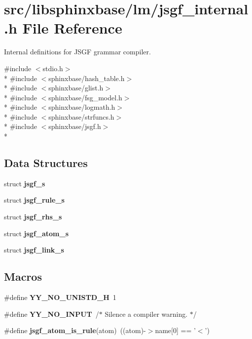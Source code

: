 \section{src/libsphinxbase/lm/jsgf\-\_\-internal.h File Reference}
\label{jsgf__internal_8h}


Internal definitions for J\-S\-G\-F grammar compiler.  


{\ttfamily \#include $<$stdio.\-h$>$}\\*
{\ttfamily \#include $<$sphinxbase/hash\-\_\-table.\-h$>$}\\*
{\ttfamily \#include $<$sphinxbase/glist.\-h$>$}\\*
{\ttfamily \#include $<$sphinxbase/fsg\-\_\-model.\-h$>$}\\*
{\ttfamily \#include $<$sphinxbase/logmath.\-h$>$}\\*
{\ttfamily \#include $<$sphinxbase/strfuncs.\-h$>$}\\*
{\ttfamily \#include $<$sphinxbase/jsgf.\-h$>$}\\*
\subsection*{Data Structures}
\begin{DoxyCompactItemize}
\item 
struct {\bf jsgf\-\_\-s}
\item 
struct {\bf jsgf\-\_\-rule\-\_\-s}
\item 
struct {\bf jsgf\-\_\-rhs\-\_\-s}
\item 
struct {\bf jsgf\-\_\-atom\-\_\-s}
\item 
struct {\bf jsgf\-\_\-link\-\_\-s}
\end{DoxyCompactItemize}
\subsection*{Macros}
\begin{DoxyCompactItemize}
\item 
\#define {\bfseries Y\-Y\-\_\-\-N\-O\-\_\-\-U\-N\-I\-S\-T\-D\-\_\-\-H}~1\label{jsgf__internal_8h_ae78ac56cd1f29572e967ed7636952d15}

\item 
\#define {\bfseries Y\-Y\-\_\-\-N\-O\-\_\-\-I\-N\-P\-U\-T}~/$\ast$ Silence a compiler warning. $\ast$/\label{jsgf__internal_8h_a85523a0c7d95c059d251b4e9829947aa}

\item 
\#define {\bfseries jsgf\-\_\-atom\-\_\-is\-\_\-rule}(atom)~((atom)-\/$>$name[0] == '$<$')\label{jsgf__internal_8h_ac4452bbb59863e64d73f4fe2d6cd394f}

\end{DoxyCompactItemize}
